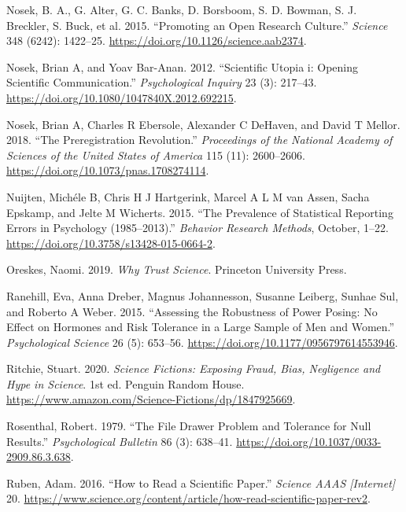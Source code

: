 \documentclass[
  letterpaper,
  DIV=11,
  numbers=noendperiod]{scrartcl}
\newlength{\cslhangindent}
\newenvironment{CSLReferences}[2] %
 {\begin{list}{}{%
  \setlength{\itemindent}{0pt}
  \setlength{\leftmargin}{0pt}
  \setlength{\parsep}{0pt}
  \ifodd #1
   \setlength{\leftmargin}{\cslhangindent}
   \setlength{\itemindent}{-1\cslhangindent}
  \fi
  \setlength{\itemsep}{#2\baselineskip}}}
 {\end{list}}
\begin{document}
\begin{CSLReferences}{1}{0}
Nosek, B. A., G. Alter, G. C. Banks, D. Borsboom, S. D. Bowman, S. J.
Breckler, S. Buck, et al. 2015. {``Promoting an Open Research
Culture.''} \emph{Science} 348 (6242): 1422--25.
\url{https://doi.org/10.1126/science.aab2374}.

Nosek, Brian A, and Yoav Bar-Anan. 2012. {``Scientific Utopia i: Opening
Scientific Communication.''} \emph{Psychological {I}nquiry} 23 (3):
217--43. \url{https://doi.org/10.1080/1047840X.2012.692215}.

Nosek, Brian A, Charles R Ebersole, Alexander C DeHaven, and David T
Mellor. 2018. {``The Preregistration Revolution.''} \emph{Proceedings of
the National Academy of Sciences of the United States of America} 115
(11): 2600--2606. \url{https://doi.org/10.1073/pnas.1708274114}.

Nuijten, Michéle B, Chris H J Hartgerink, Marcel A L M van Assen, Sacha
Epskamp, and Jelte M Wicherts. 2015. {``The Prevalence of Statistical
Reporting Errors in Psychology (1985--2013).''} \emph{Behavior Research
Methods}, October, 1--22.
\url{https://doi.org/10.3758/s13428-015-0664-2}.

Oreskes, Naomi. 2019. \emph{{W}hy {T}rust {S}cience}. Princeton
University Press.

Ranehill, Eva, Anna Dreber, Magnus Johannesson, Susanne Leiberg, Sunhae
Sul, and Roberto A Weber. 2015. {``Assessing the Robustness of Power
Posing: No Effect on Hormones and Risk Tolerance in a Large Sample of
Men and Women.''} \emph{Psychological Science} 26 (5): 653--56.
\url{https://doi.org/10.1177/0956797614553946}.

Ritchie, Stuart. 2020. \emph{Science Fictions: Exposing Fraud, Bias,
Negligence and Hype in Science}. 1st ed. Penguin Random House.
\url{https://www.amazon.com/Science-Fictions/dp/1847925669}.

Rosenthal, Robert. 1979. {``The File Drawer Problem and Tolerance for
Null Results.''} \emph{Psychological Bulletin} 86 (3): 638--41.
\url{https://doi.org/10.1037/0033-2909.86.3.638}.

Ruben, Adam. 2016. {``How to Read a Scientific Paper.''}
\emph{Science\textbar{} AAAS {[}Internet{]}} 20.
\url{https://www.science.org/content/article/how-read-scientific-paper-rev2}.


\end{CSLReferences}
\end{document}

